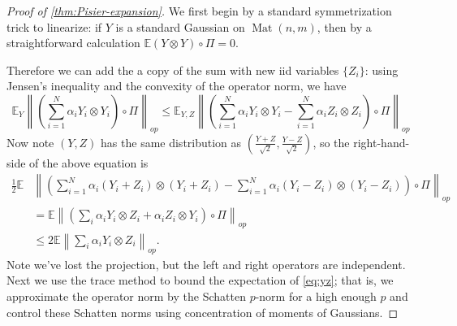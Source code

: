 \documentclass{article}
\newcommand{\ot}{\otimes}
\newcommand{\mat}{\operatorname{Mat}}
\newcommand{\E}{\mathbb{E}}
\newcommand\tr{\operatorname{Tr}}
\newcommand{\CF}[1]{{\color{purple}[CF: #1]}}
\begin{document}
\begin{proof} [Proof of \ref{thm:Pisier-expansion}]
We first begin by a standard symmetrization trick to linearize: if $Y$ is a standard Gaussian on $\mat(n,m)$, then by a straightforward calculation $\E (Y \otimes Y)\circ \Pi = 0$.

Therefore we can add the a copy of the sum with new iid variables $\{Z_{i}\}$: using Jensen's inequality and the convexity of the operator norm, we have
\[ \E_{Y} \left\|\left(\sum_{i=1}^{N} \alpha_{i} Y_{i} \otimes Y_{i}\right) \circ \Pi\right\|_{op} \leq 
\E_{Y,Z} \left\|\left(\sum_{i=1}^{N} \alpha_{i} Y_{i} \otimes Y_{i}-\sum_{i=1}^{N} \alpha_{i} Z_{i} \otimes Z_{i}\right) \circ \Pi \right\|_{op}  \] Now note $(Y,Z)$ has the same distribution as $(\frac{Y+Z}{\sqrt{2}},\frac{Y-Z}{\sqrt{2}})$, so the right-hand-side of the above equation is
\begin{align}\frac{1}{2}\E &\left\|\left(\sum_{i=1}^{N} \alpha_{i} (Y_{i}+Z_{i}) \otimes (Y_{i}+Z_{i})  - \sum_{i=1}^{N} \alpha_{i} (Y_{i}-Z_{i}) \otimes (Y_{i}-Z_{i})\right)\circ \Pi \right\|_{op}\nonumber \\ 
& = \E \left\|\left(\sum_{i} \alpha_{i} Y_{i} \otimes Z_{i}  + \alpha_{i} Z_{i} \otimes Y_{i} \right) \circ \Pi \right\|_{op}  \nonumber\\
& \leq 2 \E \left\|\sum_{i} \alpha_{i} Y_{i} \otimes Z_{i}\right\|_{op}.   \label{eq:yz}
\end{align}
Note we've lost the projection, but the left and right operators are independent. Next we use the trace method to bound the expectation of \cref{eq:yz}; that is, we approximate the operator norm by the Schatten $p$-norm for a high enough $p$ and control these Schatten norms using concentration of moments of Gaussians.  


\end{proof}
\end{document}
